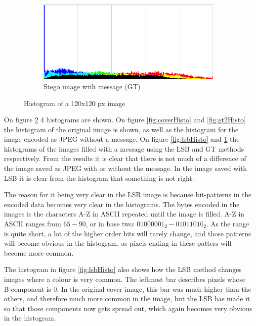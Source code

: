 \begin{figure}
\begin{subfigure}[b]{0.49\textwidth}
    \end{subfigure}
    \begin{subfigure}[b]{0.49\textwidth}
            \includegraphics[width=\textwidth]{figures/gtOutHisto.png}
            \caption{Stego image with message (GT)}
            \label{fig:gtHisto}
    \end{subfigure}
    \caption{Histogram of a 120x120 px image}
    \label{fig:histogramsComparisons}
\end{figure}

On figure \ref{fig:histogramsComparisons} 4 histograms are shown.
On figure \ref{fig:coverHisto} and \ref{fig:gt2Histo} the histogram of the original image is shown, as well as the histogram for the image encoded as JPEG without a message.
On figure \ref{fig:lsbHisto} and \ref{fig:gtHisto} the histograms of the images filled with a message using the LSB and GT methods respectively.
From the results it is clear that there is not much of a difference of the image saved as JPEG with or without the message.
In the image saved with LSB it is clear from the histogram that something is not right.

The reason for it being very clear in the LSB image is because bit-patterns in the encoded data becomes very clear in the histograms.
The bytes encoded in the images is the characters A-Z in ASCII repeated until the image is filled.
A-Z in ASCII ranges from $65-90$, or in base two: $01000001_2-01011010_2$.
As the range is quite short, a lot of the higher order bits will rarely change, and those patterns will become obvious in the histogram, as pixels ending in these patters will become more common.

The histogram in figure \ref{fig:lsbHisto} also shows how the LSB method changes images where a colour is very common.
The leftmost bar describes pixels whose B-component is 0.
In the original cover image, this bar was much higher than the others, and therefore much more common in the image, but the LSB has made it so that those components now gets spread out, which again becomes very obvious in the histogram.

